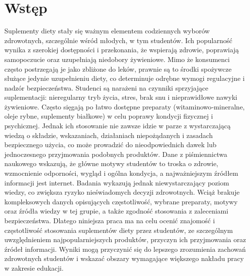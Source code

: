 \section*{Wstęp}\label{Wstęp}

Suplementy diety stały się ważnym elementem codziennych wyborów zdrowotnych, szczególnie wśród młodych, w tym studentów. Ich popularność wynika z szerokiej dostępności i przekonania, że wspierają zdrowie, poprawiają samopoczucie oraz uzupełniają niedobory żywieniowe. Mimo że konsumenci często postrzegają je jako zbliżone do leków, prawnie są to środki spożywcze służące jedynie uzupełnieniu diety, co determinuje odrębne wymogi regulacyjne i nadzór bezpieczeństwa. Studenci są narażeni na czynniki sprzyjające suplementacji: nieregularny tryb życia, stres, brak snu i nieprawidłowe nawyki żywieniowe. Często sięgają po łatwo dostępne preparaty (witaminowo‐mineralne, oleje rybne, suplementy białkowe) w celu poprawy kondycji fizycznej i psychicznej. Jednak ich stosowanie nie zawsze idzie w parze z wystarczającą wiedzą o składzie, wskazaniach, działaniach niepożądanych i zasadach bezpiecznego użycia, co może prowadzić do nieodpowiednich dawek lub jednoczesnego przyjmowania podobnych produktów. Dane z piśmiennictwa naukowego wskazują, że główne motywy studentów to troska o zdrowie, wzmocnienie odporności, wygląd i ogólna kondycja, a najważniejszym źródłem informacji jest internet. Badania wykazują jednak niewystarczający poziom wiedzy, co zwiększa ryzyko nieświadomych decyzji zdrowotnych. Wciąż brakuje kompleksowych danych opisujących częstotliwość, wybrane preparaty, motywy oraz źródła wiedzy w tej grupie, a także zgodność stosowania z zaleceniami bezpieczeństwa. Dlatego niniejsza praca ma na celu ocenić znajomość i częstotliwość stosowania suplementów diety przez studentów, ze szczególnym uwzględnieniem najpopularniejszych produktów, przyczyn ich przyjmowania oraz źródeł informacji. Wyniki mogą przyczynić się do lepszego zrozumienia zachowań zdrowotnych studentów i wskazać obszary wymagające większego nakładu pracy w zakresie edukacji.

